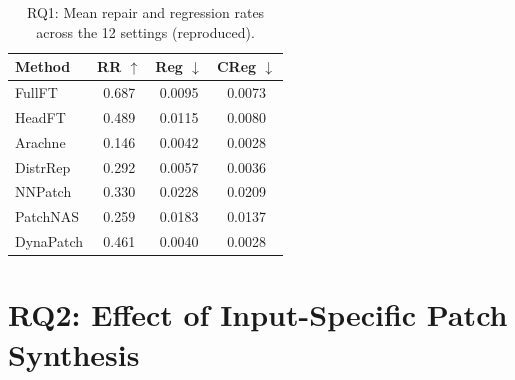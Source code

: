 \documentclass{article}
\begin{document}
\begin{table}[h]
\centering
\caption{RQ1: Mean repair and regression rates across the 12 settings (reproduced).}
\label{tab:repro_rq1_summary}
\small
\begin{tabular}{lccc}
\toprule
Method & RR $\uparrow$ & Reg $\downarrow$ & CReg $\downarrow$ \\
\midrule
FullFT & 0.687 & 0.0095 & 0.0073 \\
HeadFT & 0.489 & 0.0115 & 0.0080 \\
Arachne & 0.146 & 0.0042 & 0.0028 \\
DistrRep & 0.292 & 0.0057 & 0.0036 \\
NNPatch & 0.330 & 0.0228 & 0.0209 \\
PatchNAS & 0.259 & 0.0183 & 0.0137 \\
DynaPatch & 0.461 & 0.0040 & 0.0028 \\
\bottomrule
\end{tabular}
\end{table}

\section*{RQ2: Effect of Input-Specific Patch Synthesis}
\end{document}
